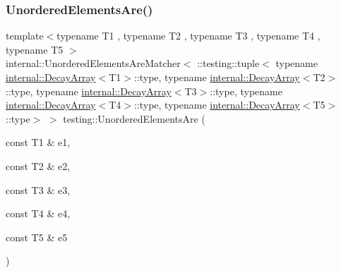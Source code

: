 \subsubsection{\texorpdfstring{UnorderedElementsAre()}{UnorderedElementsAre()}\hspace{0.1cm}{\footnotesize\ttfamily [6/11]}}
{\footnotesize\ttfamily template$<$typename T1 , typename T2 , typename T3 , typename T4 , typename T5 $>$ \\
internal\+::\+Unordered\+Elements\+Are\+Matcher$<$ \+::testing\+::tuple$<$ typename \mbox{\hyperlink{structtesting_1_1internal_1_1_decay_array}{internal\+::\+Decay\+Array}}$<$T1$>$\+::type, typename \mbox{\hyperlink{structtesting_1_1internal_1_1_decay_array}{internal\+::\+Decay\+Array}}$<$T2$>$\+::type, typename \mbox{\hyperlink{structtesting_1_1internal_1_1_decay_array}{internal\+::\+Decay\+Array}}$<$T3$>$\+::type, typename \mbox{\hyperlink{structtesting_1_1internal_1_1_decay_array}{internal\+::\+Decay\+Array}}$<$T4$>$\+::type, typename \mbox{\hyperlink{structtesting_1_1internal_1_1_decay_array}{internal\+::\+Decay\+Array}}$<$T5$>$\+::type$>$ $>$ testing\+::\+Unordered\+Elements\+Are (\begin{DoxyParamCaption}\item[{const T1 \&}]{e1,  }\item[{const T2 \&}]{e2,  }\item[{const T3 \&}]{e3,  }\item[{const T4 \&}]{e4,  }\item[{const T5 \&}]{e5 }\end{DoxyParamCaption})\hspace{0.3cm}{\ttfamily [inline]}}

\mbox{\label{namespacetesting_aff1859501ecd94dd1bc428d146a66fdc}} 

